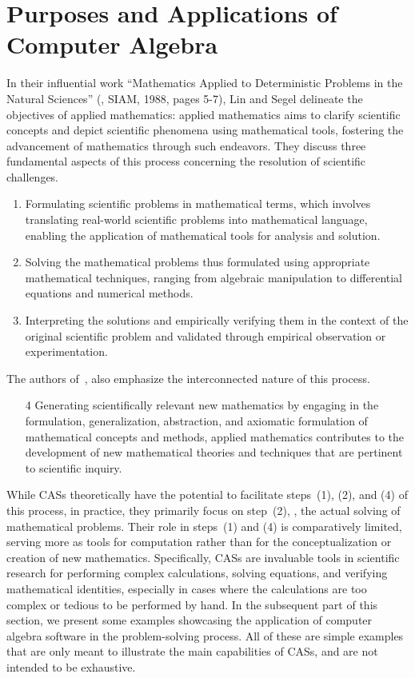 
\section{Purposes and Applications of Computer Algebra}

In their influential work ``{Mathematics Applied to Deterministic Problems in the Natural Sciences}'' (\cite{li1998making}, SIAM, 1988, pages 5-7), Lin and Segel delineate the objectives of applied mathematics: applied mathematics aims to clarify scientific concepts and depict scientific phenomena using mathematical tools, fostering the advancement of mathematics through such endeavors. They discuss three fundamental aspects of this process concerning the resolution of scientific challenges.
%
\begin{enumerate}
  \setlength{\itemsep}{0.0em}
  \item Formulating scientific problems in mathematical terms, which involves translating real-world scientific problems into mathematical language, enabling the application of mathematical tools for analysis and solution.
  \item Solving the mathematical problems thus formulated using appropriate mathematical techniques, ranging from algebraic manipulation to differential equations and numerical methods.
  \item Interpreting the solutions and empirically verifying them in the context of the original scientific problem and validated through empirical observation or experimentation.
\end{enumerate}
%
The authors of~\cite{li1998making}, also emphasize the interconnected nature of this process.
%
\begin{enumerate}
  \setlength{\itemsep}{0.0em}
  \item[4] Generating scientifically relevant new mathematics by engaging in the formulation, generalization, abstraction, and axiomatic formulation of mathematical concepts and methods, applied mathematics contributes to the development of new mathematical theories and techniques that are pertinent to scientific inquiry.
\end{enumerate}
%
While \acp{CAS} theoretically have the potential to facilitate steps~(1), (2), and (4) of this process, in practice, they primarily focus on step~(2), \ie{}, the actual solving of mathematical problems. Their role in steps~(1) and (4) is comparatively limited, serving more as tools for computation rather than for the conceptualization or creation of new mathematics. Specifically, \acp{CAS} are invaluable tools in scientific research for performing complex calculations, solving equations, and verifying mathematical identities, especially in cases where the calculations are too complex or tedious to be performed by hand. In the subsequent part of this section, we present some examples showcasing the application of computer algebra software in the problem-solving process. All of these are simple examples that are only meant to illustrate the main capabilities of \acp{CAS}, and are not intended to be exhaustive.


